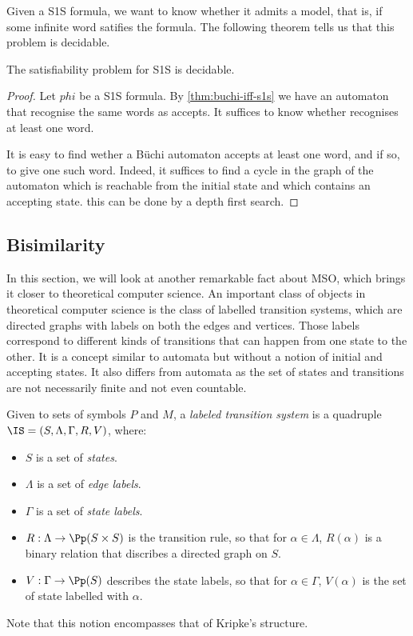 Given a S1S formula, we want to know whether it admits a model, that is,
if some infinite word satifies the formula. The following theorem
tells us that this problem is decidable.

\begin{theorem}
    The satisfiability problem for S1S is decidable.
\end{theorem}
\begin{proof}
    Let $phi$ be a S1S formula. By \autoref{thm:buchi-iff-s1s} we have
    an automaton \Aa that recognise the same words as \phi accepts.
    It suffices to know whether \Aa recognises at least one word.

    It is easy to find wether a Büchi automaton accepts at least one word,
    and if so, to give one such word. Indeed, it suffices to find
    a cycle in the graph of the automaton which is reachable from
    the initial state and which contains an accepting state.
    this can be done by a depth first search.
\end{proof}

\subsection{Bisimilarity}

In this section, we will look at another remarkable fact
about MSO, which brings it closer to theoretical computer science.
An important class of objects in theoretical computer science
is the class of labelled transition systems,
which are directed graphs with labels on both the edges and vertices.
Those labels correspond to different kinds of transitions
that can happen from one state to the other. It is a concept similar
to automata but without a notion of initial and accepting states.
It also differs from automata as the set of states and transitions are not necessarily finite
and not even countable.

\begin{definition}
    Given to sets of symbols $P$ and $M$,
    a \emph{labeled transition system}
    is a quadruple $\IS = (S, \Lambda, \Gamma, R, V)$, where:
    \begin{itemize}
        \item $S$ is a set of \emph{states}.
        \item $\Lambda$ is a set of \emph{edge labels}.
        \item $\Gamma$ is a set of \emph{state labels}.
        \item $R: \Lambda \to \Pp(S \times S)$ is the transition rule,
            so that for $\alpha \in \Lambda$, $R(\alpha)$ is a binary relation
            that discribes a directed graph on $S$.
        \item $V: \Gamma \to \Pp(S)$ describes the state labels,
            so that for $\alpha \in \Gamma$,
            $V(\alpha)$ is the set of state labelled with $\alpha$.
    \end{itemize}

    Note that this notion encompasses that of Kripke's structure.
\end{definition}

